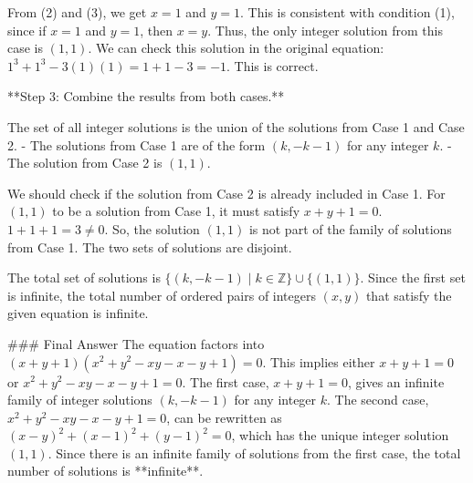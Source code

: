 From (2) and (3), we get $x=1$ and $y=1$. This is consistent with condition (1), since if $x=1$ and $y=1$, then $x=y$.
Thus, the only integer solution from this case is $(1, 1)$.
We can check this solution in the original equation: $1^3 + 1^3 - 3(1)(1) = 1 + 1 - 3 = -1$. This is correct.

**Step 3: Combine the results from both cases.**

The set of all integer solutions is the union of the solutions from Case 1 and Case 2.
- The solutions from Case 1 are of the form $(k, -k-1)$ for any integer $k$.
- The solution from Case 2 is $(1, 1)$.

We should check if the solution from Case 2 is already included in Case 1. For $(1, 1)$ to be a solution from Case 1, it must satisfy $x+y+1=0$.
$1+1+1 = 3 \neq 0$.
So, the solution $(1, 1)$ is not part of the family of solutions from Case 1. The two sets of solutions are disjoint.

The total set of solutions is $\{(k, -k-1) \mid k \in \mathbb{Z}\} \cup \{(1, 1)\}$.
Since the first set is infinite, the total number of ordered pairs of integers $(x,y)$ that satisfy the given equation is infinite.

### Final Answer
The equation factors into $(x+y+1)(x^2+y^2-xy-x-y+1) = 0$.
This implies either $x+y+1=0$ or $x^2+y^2-xy-x-y+1=0$.
The first case, $x+y+1=0$, gives an infinite family of integer solutions $(k, -k-1)$ for any integer $k$.
The second case, $x^2+y^2-xy-x-y+1=0$, can be rewritten as $(x-y)^2+(x-1)^2+(y-1)^2=0$, which has the unique integer solution $(1,1)$.
Since there is an infinite family of solutions from the first case, the total number of solutions is **infinite**.